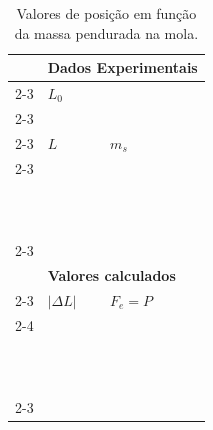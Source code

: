 \begin{table}
\centering
\begin{tabular}{lp{25mm}p{25mm}l}
\toprule
	& \multicolumn{3}{l}{\textbf{Dados Experimentais}} \\
	\cmidrule{2-3}
	& \cellcolor[gray]{0.89} $L_0$ & \cellcolor[gray]{0.92} \\
	\cmidrule{2-3}
	\\
	\cmidrule{2-3}
	& $L$ & $m_s$ & \\
	\cmidrule{2-3}
	& \cellcolor[gray]{0.89} & \cellcolor[gray]{0.92} \\
	& \cellcolor[gray]{0.95} & \cellcolor[gray]{0.97} \\
	& \cellcolor[gray]{0.89} & \cellcolor[gray]{0.92} \\
	& \cellcolor[gray]{0.95} & \cellcolor[gray]{0.97} \\
	& \cellcolor[gray]{0.89} & \cellcolor[gray]{0.92} \\
	& \cellcolor[gray]{0.95} & \cellcolor[gray]{0.97} \\
	& \cellcolor[gray]{0.89} & \cellcolor[gray]{0.92} \\
	& \cellcolor[gray]{0.95} & \cellcolor[gray]{0.97} \\
	& \cellcolor[gray]{0.89} & \cellcolor[gray]{0.92} \\
	& \cellcolor[gray]{0.95} & \cellcolor[gray]{0.97} \\
	& \cellcolor[gray]{0.89} & \cellcolor[gray]{0.92} \\
	& \cellcolor[gray]{0.95} & \cellcolor[gray]{0.97} \\
	\cmidrule{2-3}
\\
	& \multicolumn{3}{l}{\textbf{Valores calculados}} \\
	\cmidrule{2-3}
	& $|\Delta L|$ & $F_e = P$ \\
	\cmidrule{2-4}
	& \cellcolor[gray]{0.89} & \cellcolor[gray]{0.92} \\
	& \cellcolor[gray]{0.95} & \cellcolor[gray]{0.97} \\
	& \cellcolor[gray]{0.89} & \cellcolor[gray]{0.92} \\
	& \cellcolor[gray]{0.95} & \cellcolor[gray]{0.97} \\
	& \cellcolor[gray]{0.89} & \cellcolor[gray]{0.92} \\
	& \cellcolor[gray]{0.95} & \cellcolor[gray]{0.97} \\
	& \cellcolor[gray]{0.89} & \cellcolor[gray]{0.92} \\
	& \cellcolor[gray]{0.95} & \cellcolor[gray]{0.97} \\
	& \cellcolor[gray]{0.89} & \cellcolor[gray]{0.92} \\
	& \cellcolor[gray]{0.95} & \cellcolor[gray]{0.97} \\
	& \cellcolor[gray]{0.89} & \cellcolor[gray]{0.92} \\
	& \cellcolor[gray]{0.95} & \cellcolor[gray]{0.97} \\
	\cmidrule{2-3}
\bottomrule
\end{tabular}
\caption{Valores de posição em função da massa pendurada na mola.}
\label{Dados}
\end{table}
